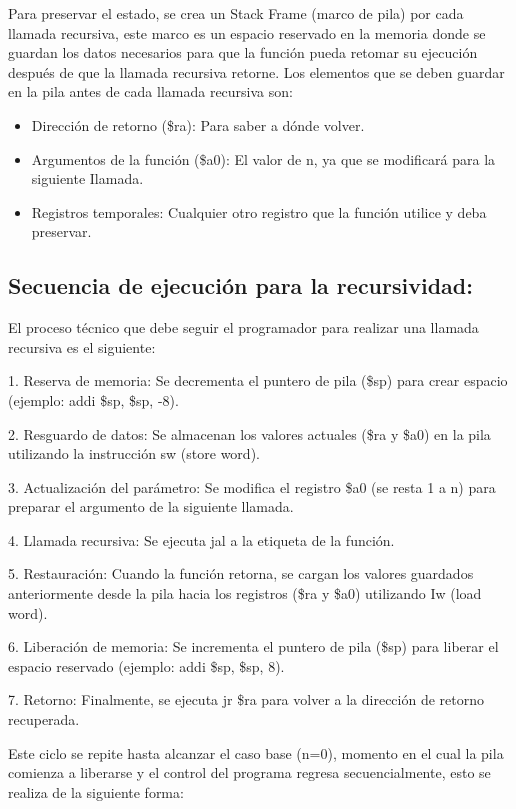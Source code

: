 \documentclass[12pt, letterpaper]{article}
\begin{document}
Para preservar el estado, se crea un Stack Frame (marco de pila) por cada llamada recursiva, este marco es un espacio reservado en la memoria donde se guardan los datos necesarios para que la función pueda retomar su ejecución después de que la llamada recursiva retorne. Los elementos que se deben guardar en la pila antes de cada llamada recursiva son:

\begin{itemize}
    \item Dirección de retorno (\$ra): Para saber a dónde volver.
    \item Argumentos de la función (\$a0): El valor de n, ya que se modificará para la siguiente Ilamada.
    \item Registros temporales: Cualquier otro registro que la función utilice y deba preservar.
\end{itemize}

\subsection*{Secuencia de ejecución para la recursividad:}

El proceso técnico que debe seguir el programador para realizar una llamada recursiva es el siguiente:

1. Reserva de memoria: Se decrementa el puntero de pila (\$sp) para crear espacio (ejemplo: addi \$sp, \$sp, -8).

2. Resguardo de datos: Se almacenan los valores actuales (\$ra y \$a0) en la pila utilizando la instrucción sw (store word).

3. Actualización del parámetro: Se modifica el registro \$a0 (se resta 1 a n) para preparar el argumento de la siguiente llamada.

4. Llamada recursiva: Se ejecuta jal a la etiqueta de la función.

5. Restauración: Cuando la función retorna, se cargan los valores guardados anteriormente desde la pila hacia los registros (\$ra y \$a0) utilizando Iw (load word).

6. Liberación de memoria: Se incrementa el puntero de pila (\$sp) para liberar el espacio reservado (ejemplo: addi \$sp, \$sp, 8).

7. Retorno: Finalmente, se ejecuta jr \$ra para volver a la dirección de retorno recuperada.

Este ciclo se repite hasta alcanzar el caso base (n=0), momento en el cual la pila comienza a liberarse y el control del programa regresa secuencialmente, esto se realiza de la siguiente forma:
\end{document}

